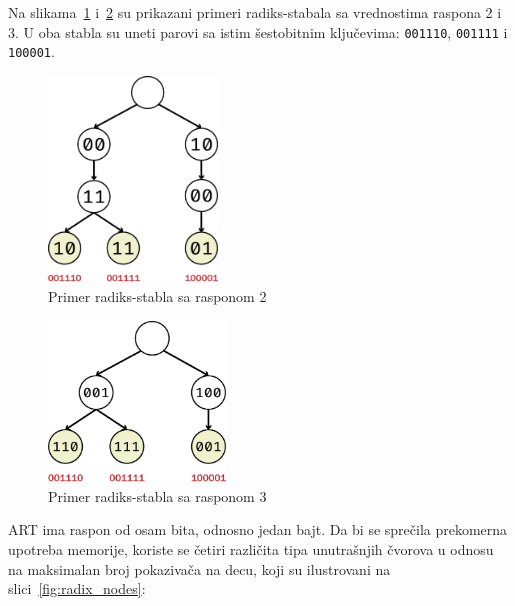 \documentclass[12pt,oneside]{memoir}
\begin{document}
Na slikama~\ref{fig:radix_span2}
i~\ref{fig:radix_span3} su prikazani primeri radiks-stabala sa vrednostima
raspona 2 i 3. U oba stabla su uneti parovi sa istim šestobitnim ključevima:
\texttt{001110}, \texttt{001111} i \texttt{100001}.


\begin{figure}[!h]
  \centering
  \includegraphics[width=0.40\textwidth]{radix_span2.eps}
  \caption{Primer radiks-stabla sa rasponom 2}
  \label{fig:radix_span2}
\end{figure}

\begin{figure}[!h]
  \centering
  \includegraphics[width=0.42\textwidth]{radix_span3.eps}
  \caption{Primer radiks-stabla sa rasponom 3}
  \label{fig:radix_span3}
\end{figure}

ART ima raspon od osam bita, odnosno jedan bajt. Da bi se sprečila prekomerna
upotreba memorije, koriste se četiri različita tipa unutrašnjih čvorova u odnosu
na maksimalan broj pokazivača na decu, koji su ilustrovani na
slici~\ref{fig:radix_nodes}:
\end{document}
